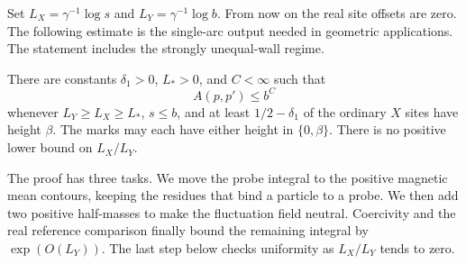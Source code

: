 Set $L_X=\gamma^{-1}\log s$ and $L_Y=\gamma^{-1}\log b$.
From now on the real site offsets are zero.  The following estimate
is the single-arc output needed in geometric applications.  The
statement includes the strongly unequal-wall regime.

\begin{theorem}
\label{09_fast_paths:one-arc-bound}\label{thm:one-arc}
There are constants $\delta_1>0$, $L_*>0$, and $C<\infty$ such
that
\[
                         A(p,p')\le b^C
\]
whenever $L_Y\ge L_X\ge L_*$, $s\le b$, and at least
$1/2-\delta_1$ of the ordinary $X$ sites have height $\beta$.
The marks may each have either height in $\{0,\beta\}$.
There is no positive lower bound on $L_X/L_Y$.
\end{theorem}

The proof has three tasks.  We move the probe integral to the positive
magnetic mean contours, keeping the residues that bind a particle to a
probe.  We then add two positive half-masses to make the fluctuation
field neutral.  Coercivity and the real reference comparison finally
bound the remaining integral by $\exp(O(L_Y))$.  The last step below
checks uniformity as $L_X/L_Y$ tends to zero.


